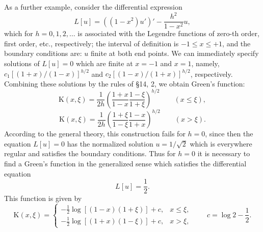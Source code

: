 As a further example, consider the differential expression
\[
L[u]=((1-x^2)u')'-\frac{h^2}{1-x^2}u,
\]
which for $h=0,1,2,\ldots$ is associated with the Legendre functions of zero-th order, first order, etc., respectively; the interval of definition is $-1\le x\le+1$, and the boundary conditions are: $u$ finite at both end points. We can immediately specify solutions of $L[u]=0$ which are finite at $x=-1$ and $x=1$, namely, $c_1[(1+x)/(1-x)]^{h/2}$ and $c_2[(1-x)/(1+x)]^{h/2}$, respectively. Combining these solutions by the rules of \S14, 2, we obtain Green's function:
\[
\mathrm K(x,\xi)=\frac1{2h}\left(\frac{1+x}{1-x}\frac{1-\xi}{1+\xi}\right)^{h/2}\qquad(x\le\xi),
\]
\[
\mathrm K(x,\xi)=\frac1{2h}\left(\frac{1+\xi}{1-\xi}\frac{1-x}{1+x}\right)^{h/2}\qquad(x>\xi).
\]
According to the general theory, this construction fails for $h=0$, since then the equation $L[u]=0$ has the normalized solution $u=1/\sqrt2$ which is everywhere regular and satisfies the boundary conditions. Thus for $h=0$ it is necessary to find a Green's function in the generalized sense which satisfies the differential equation
\[
L[u]=\frac12.
\]
This function is given by
\[
\mathrm K(x,\xi)=
\begin{cases}
-\frac12\log[(1-x)(1+\xi)]+c,&x\le\xi,\\
-\frac12\log[(1+x)(1-\xi)]+c,&x>\xi,
\end{cases}
\qquad c=\log2-\frac12.
\]

